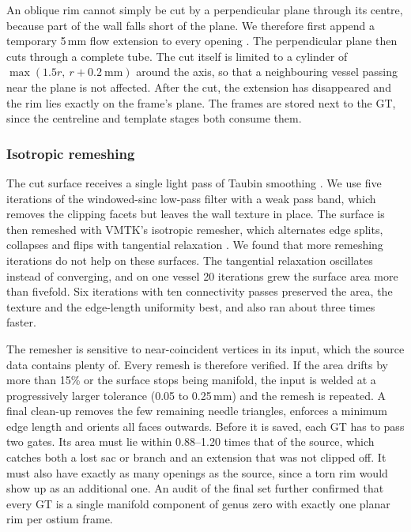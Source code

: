 An oblique rim cannot simply be cut by a perpendicular plane through its centre, because part of the wall falls short of the plane. We therefore first append a temporary 5\,mm flow extension to every opening \citep{antiga2008}. The perpendicular plane then cuts through a complete tube. The cut itself is limited to a cylinder of $\max(1.5r,\ r + 0.2\ \text{mm})$ around the axis, so that a neighbouring vessel passing near the plane is not affected. After the cut, the extension has disappeared and the rim lies exactly on the frame's plane. The frames are stored next to the GT, since the centreline and template stages both consume them.

\subsubsection*{Isotropic remeshing}

The cut surface receives a single light pass of Taubin smoothing \citep{taubin1995,taubin1996}. We use five iterations of the windowed-sinc low-pass filter with a weak pass band, which removes the clipping facets but leaves the wall texture in place. The surface is then remeshed with VMTK's isotropic remesher, which alternates edge splits, collapses and flips with tangential relaxation \citep{botsch2004,botsch2010}. We found that more remeshing iterations do not help on these surfaces. The tangential relaxation oscillates instead of converging, and on one vessel 20 iterations grew the surface area more than fivefold. Six iterations with ten connectivity passes preserved the area, the texture and the edge-length uniformity best, and also ran about three times faster.

The remesher is sensitive to near-coincident vertices in its input, which the source data contains plenty of. Every remesh is therefore verified. If the area drifts by more than 15\% or the surface stops being manifold, the input is welded at a progressively larger tolerance (0.05 to 0.25\,mm) and the remesh is repeated. A final clean-up removes the few remaining needle triangles, enforces a minimum edge length and orients all faces outwards. Before it is saved, each GT has to pass two gates. Its area must lie within 0.88--1.20 times that of the source, which catches both a lost sac or branch and an extension that was not clipped off. It must also have exactly as many openings as the source, since a torn rim would show up as an additional one. An audit of the final set further confirmed that every GT is a single manifold component of genus zero with exactly one planar rim per ostium frame.

